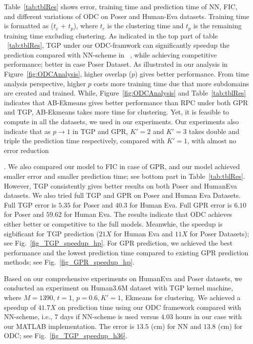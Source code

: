 Table~\ref{tab:tblRes} shows error, training time and prediction time of NN, FIC, and different variations of ODC  on Poser and Human-Eva datasets. Training time is formatted as ($t_c$ + $t_p$),  where $t_c$ is the clustering time and $t_p$ is the remaining training time excluding  clustering.  As indicated in the top part of table ~\ref{tab:tblRes}, TGP  under our ODC-framwork can significantly speedup the prediction compared with NN-scheme in ~\cite{Bo:2010}, while achieving competitive performance; better in case Poser Dataset. As illustrated in our analysis in Figure~\ref{fig:ODCAnalysis}, higher overlap ($p$) gives better performance. From time analysis perspective, higher $p$ costs more training time due that more subdomains are created and trained.  While, Figure~\ref{fig:ODCAnalysis} and Table~\ref{tab:tblRes} indicates that AB-Ekmeans gives better performance than RPC under both GPR and TGP, AB-Ekmeans takes more time for clustering. Yet,  it is feasible to compute in all the datasets, we used in our experiments. Our experiments also indicate that as $p \to 1$ in TGP and GPR,    $K'=2$ and $K'=3$ takes double and triple the prediction time respectively, compared with $K'=1$, with almost no error reduction. We also compared our model to FIC in case of GPR, and our model achieved smaller error and smaller prediction time; see bottom part in Table~\ref{tab:tblRes}. However, TGP consistently gives better results on both Poser and HumanEva datasets. We also tried full TGP and GPR on Poser and Human Eva Datasets. Full TGP error is $5.35$ for Poser and $40.3$ for Human Eva. Full GPR error is $6.10$ for Poser and $59.62$ for Human Eva. The results indicate that ODC achieves either better or competitive to the full models. Meanwhie, the speedup is sigbificant for TGP prediction ($21X$ for Human Eva and $11X$  for Poser Datasets); see Fig.~\ref{fig_TGP_speedup_hp}. For GPR prediction, we achieved the best performance and the lowest prediction time compared to existing GPR prediction methods; see Fig.~\ref{fig_GPR_speedup_hp}.

Based on our comprehensive experiments on HumanEva and Poser datasets, we conducted an experiment on Human3.6M  dataset with TGP kernel machine, where $M = 1390$, $t=1$,  $p = 0.6, K'=1$, Ekmeans for clustering. We achieved a speedup of ${41.7X}$ on prediction time using our ODC framework  compared with NN-scheme, i.e., $7$ days if NN-scheme is used versus $4.03$ hours in our case with our MATLAB implementation. The error is $13.5$ (cm) for NN and $13.8$ (cm) for ODC; see Fig.~\ref{fig_TGP_speedup_h36}.

